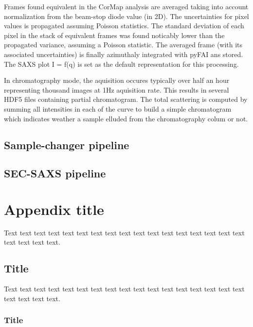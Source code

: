 \documentclass[preprint]{iucr}              %
\begin{document}
Frames found equivalent in the CorMap analysis are averaged taking into account normalization from the beam-stop diode value (in 2D).
The uncertainties for pixel values is propagated assuming Poisson statistics. 
The standard deviation of each pixel in the stack of equivalent frames was found noticably lower than the propagated variance, assuming a Poisson statistic.
The averaged frame (with its associated uncertainties) is finally azimuthaly integrated with pyFAI ans stored. 
The SAXS plot I = f(q) is set as the default representation for this processing.

In chromatography mode, the aquisition occures typically over half an hour representing thousand images at 1Hz aquisition rate. 
This results in several HDF5 files containing partial chromatogram.
The total scattering is computed by summing all intensities in each of the curve to build a simple chromatogram which indicates weather a sample elluded 
from the chromatography colum or not.

\subsection{Sample-changer pipeline}


\subsection{SEC-SAXS pipeline}


\appendix
\section{Appendix title}

Text text text text text text text text text text text text text text
text text text text text text text.

\subsection{Title}

Text text text text text text text text text text text text text text
text text text text text text text.

\subsubsection{Title}
\end{document}
